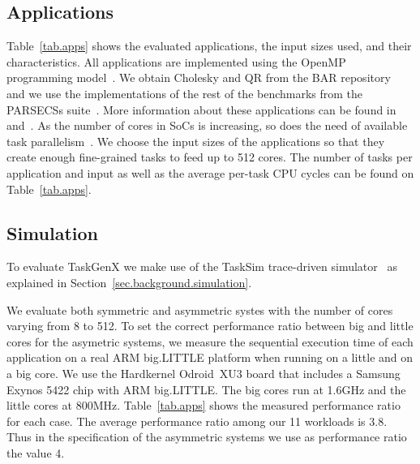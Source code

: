 \subsection{Applications}
Table~\ref{tab.apps} shows the evaluated applications, the input sizes used, and their characteristics. 
All applications are implemented using the OpenMP programming model~\cite{OpenMP4.0:Manual2015}. 
We obtain Cholesky and QR from the BAR repository~\cite{BAR} and we use the implementations of the rest of the benchmarks from the PARSECSs suite~\cite{Chasapis:TACO2016}.
More information about these applications can be found in~\cite{Chasapis:TACO2016} and~\cite{Chronaki:ICS2015}.
As the number of cores in SoCs is increasing, so does the need of available task parallelism~\cite{Sanchez:2010}. 
We choose the input sizes of the applications so that they create enough fine-grained tasks to feed up to 512 cores.
The number of tasks per application and input as well as the average per-task CPU cycles can be found on Table~\ref{tab.apps}.





\subsection{Simulation}
\label{TaskGenX:experimental:simulation}
To evaluate TaskGenX we make use of the TaskSim trace-driven simulator~\cite{AbstrLevels_TACO12,MUSA} as explained in Section~\ref{sec.background.simulation}. 

We evaluate both symmetric and asymmetric systes with the number of cores varying from 8 to 512.
To set the correct performance ratio between big and little cores for the asymetric systems, we measure the sequential execution time of each application on a real ARM big.LITTLE platform when running on a little and on a big core. 
We use the Hardkernel Odroid~XU3 board that includes a Samsung Exynos 5422 chip with ARM big.LITTLE.
The big cores run at 1.6GHz and the little cores at 800MHz.
Table~\ref{tab.apps} shows the measured performance ratio for each case.
The average performance ratio among our 11 workloads is 3.8.
Thus in the specification of the asymmetric systems we use as performance ratio the value 4.

